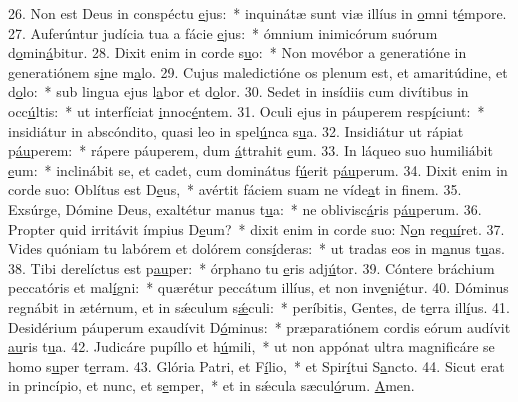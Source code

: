 26. Non est Deus in conspéctu \uline{e}jus:~* inquinátæ sunt viæ illíus in \uline{o}mni t\uline{é}mpore.
27. Auferúntur judícia tua a fácie \uline{e}jus:~* ómnium inimicórum suórum d\uline{o}min\uline{á}bitur.
28. Dixit enim in corde s\uline{u}o:~* Non movébor a generatióne in generatiónem s\uline{i}ne m\uline{a}lo.
29. Cujus maledictióne os plenum est, et amaritúdine, et d\uline{o}lo:~* sub lingua ejus l\uline{a}bor et d\uline{o}lor.
30. Sedet in insídiis cum divítibus in occ\uline{ú}ltis:~* ut interfíciat \uline{i}nnoc\uline{é}ntem.
31. Oculi ejus in páuperem resp\uline{í}ciunt:~* insidiátur in abscóndito, quasi leo in spel\uline{ú}nca s\uline{u}a.
32. Insidiátur ut rápiat p\uline{áu}perem:~* rápere páuperem, dum \uline{á}ttrahit \uline{e}um.
33. In láqueo suo humiliábit \uline{e}um:~* inclinábit se, et cadet, cum dominátus f\uline{ú}erit p\uline{áu}perum.
34. Dixit enim in corde suo: Oblítus est D\uline{e}us,~* avértit fáciem suam ne víde\uline{a}t in f\uline{i}nem.
35. Exsúrge, Dómine Deus, exaltétur manus t\uline{u}a:~* ne oblivisc\uline{á}ris p\uline{áu}perum.
36. Propter quid irritávit ímpius D\uline{e}um?~* dixit enim in corde suo: N\uline{o}n re\uline{quí}ret.
37. Vides quóniam tu labórem et dolórem cons\uline{í}deras:~* ut tradas eos in m\uline{a}nus t\uline{u}as.
38. Tibi derelíctus est p\uline{au}per:~* órphano tu \uline{e}ris adj\uline{ú}tor.
39. Cóntere bráchium peccatóris et mal\uline{í}gni:~* quærétur peccátum illíus, et non inv\uline{e}ni\uline{é}tur.
40. Dóminus regnábit in ætérnum, et in sǽculum s\uline{ǽ}culi:~* períbitis, Gentes, de t\uline{e}rra ill\uline{í}us.
41. Desidérium páuperum exaudívit D\uline{ó}minus:~* præparatiónem cordis eórum audívit \uline{au}ris t\uline{u}a.
42. Judicáre pupíllo et h\uline{ú}mili,~* ut non appónat ultra magnificáre se homo s\uline{u}per t\uline{e}rram.
43. Glória Patri, et F\uline{í}lio,~* et Spir\uline{í}tui S\uline{a}ncto.
44. Sicut erat in princípio, et nunc, et s\uline{e}mper,~* et in sǽcula sæcul\uline{ó}rum. \uline{A}men.
